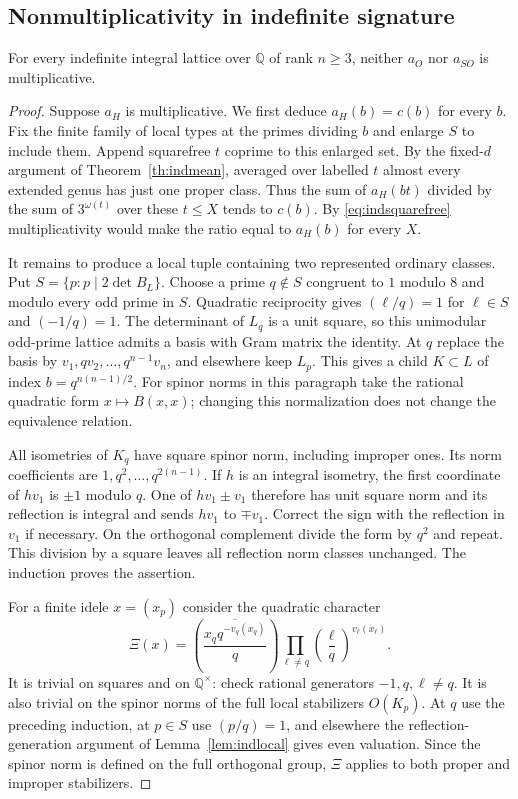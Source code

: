 \subsection{Nonmultiplicativity in indefinite signature}
\begin{theorem}\label{th:indeuler}
For every indefinite integral lattice over $\mathbb Q$ of rank $n\ge3$, neither $a_O$ nor $a_{SO}$ is multiplicative.
\end{theorem}
\begin{proof}
Suppose $a_H$ is multiplicative. We first deduce
$a_H(b)=c(b)$ for every $b$. Fix the finite family of local
types at the primes dividing $b$ and enlarge $S$ to include them. Append squarefree $t$ coprime to this enlarged set. By the fixed-$d$ argument of Theorem~\ref{th:indmean}, averaged over labelled $t$ almost every extended genus has just one proper class. Thus the sum of $a_H(bt)$ divided by the sum of $3^{\omega(t)}$ over these $t\le X$ tends to $c(b)$. By \eqref{eq:indsquarefree} multiplicativity would make the ratio equal to $a_H(b)$ for every $X$.

It remains to produce a local tuple containing two represented
ordinary classes. Put $S=\{p:p\mid2\det B_L\}$. Choose a prime $q\notin S$ congruent to $1$ modulo $8$ and modulo every odd prime in $S$. Quadratic reciprocity gives $(\ell/q)=1$ for $\ell\in S$ and $(-1/q)=1$. The determinant of $L_q$ is a unit square, so this unimodular odd-prime lattice admits a basis with Gram matrix the identity. At $q$ replace the basis by $v_1,qv_2,\ldots,q^{n-1}v_n$, and elsewhere keep $L_p$. This gives a child $K\subset L$ of index $b=q^{n(n-1)/2}$. For spinor norms in this paragraph take the rational quadratic form $x\mapsto B(x,x)$; changing this normalization does not change the equivalence relation.

All isometries of $K_q$ have square spinor norm, including improper ones. Its norm coefficients are $1,q^2,\ldots,q^{2(n-1)}$. If $h$ is an integral isometry, the first coordinate of $hv_1$ is $\pm1$ modulo $q$. One of $hv_1\pm v_1$ therefore has unit square norm and its reflection is integral and sends $hv_1$ to $\mp v_1$. Correct the sign with the reflection in $v_1$ if necessary. On the orthogonal complement divide the form by $q^2$ and repeat. This division by a square leaves all reflection norm classes unchanged. The induction proves the assertion.

For a finite idele $x=(x_p)$ consider the quadratic character
\[
 \Xi(x)=\left(\frac{\overline{x_q q^{-v_q(x_q)}}}{q}\right)
          \prod_{\ell\ne q}\left(\frac{\ell}{q}\right)^{v_\ell(x_\ell)} .
\]
It is trivial on squares and on $\mathbb Q^\times$: check rational generators $-1,q,\ell\ne q$. It is also trivial on the spinor norms of the full local stabilizers $O(K_p)$. At $q$ use the preceding induction, at $p\in S$ use $(p/q)=1$, and elsewhere the reflection-generation argument of Lemma~\ref{lem:indlocal} gives even valuation. Since the spinor norm is defined on the full orthogonal group,
$\Xi$ applies to both proper and improper stabilizers.


\end{proof}
